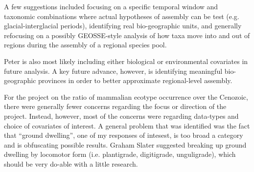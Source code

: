\documentclass{article}
\begin{document}
A few suggestions included focusing on a specific temporal window and taxonomic combinations where actual hypotheses of assembly can be test (e.g. glacial-interglacial periods), identifying real bio-geographic units, and generally refocusing on a possibly \uppercase{geosse}-style analysis of how taxa move into and out of regions during the assembly of a regional species pool. 

Peter is also most likely including either biological or environmental covariates in future analysis. A key future advance, however, is identifying meaningful bio-geographic provinces in order to better approximate regional-level assembly.

For the project on the ratio of mammalian ecotype occurrence over the Cenozoic, there were generally fewer concerns regarding the focus or direction of the project. Instead, however, most of the concerns were regarding data-types and choice of covariates of interest. A general problem that was identified was the fact that ``ground dwelling'', one of my responses of intesest, is too broad a category and is obfuscating possible results. Graham Slater suggested breaking up ground dwelling by locomotor form (i.e. plantigrade, digitigrade, unguligrade), which should be very do-able with a little research. 
\end{document}
